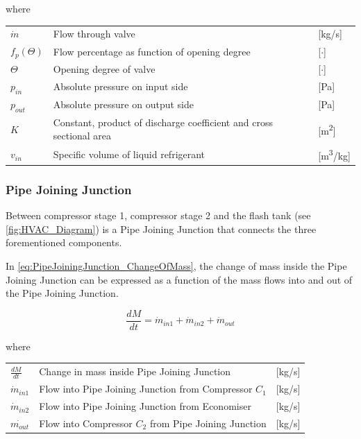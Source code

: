 where 
\begin{center}
	\begin{tabular}{l p{8cm} l}
		$\dot{m}$	& Flow through valve & [\si{kg}/\si{s}]\\ 
		$f_p(\Theta)$ & Flow percentage as function of opening degree & [$\cdot$] \\
		$ \Theta $ & Opening degree of valve& [$ \cdot $]\\
		$p_{in}$ 	& Absolute pressure on input side & [\si{Pa}]\\
		$p_{out}$ 	& Absolute pressure on output side & [\si{Pa}]\\
		$K$ 		& Constant, product of discharge coefficient and cross sectional area & [\si{m^2}]\\
		$v_{in}$ 	& Specific volume of liquid refrigerant & [\si{m^3}/\si{kg}]

	\end{tabular}
\end{center}

\subsubsection{Pipe Joining Junction} 
Between compressor stage 1, compressor stage 2 and the flash tank (see \cref{fig:HVAC_Diagram}) is a Pipe Joining Junction that connects the three forementioned components.

In \cref{eq:PipeJoiningJunction_ChangeOfMass}, the change of mass inside the Pipe Joining Junction can be expressed as a function of the mass flows into and out of the Pipe Joining Junction. 

\begin{equation} \label{eq:PipeJoiningJunction_ChangeOfMass}
	\frac{dM}{dt} = \dot{m}_{in1} + \dot{m}_{in2} + \dot{m}_{out}
\end{equation}


where 

\begin{center}
	\begin{tabular}{l p{8cm} l}
		$\frac{dM}{dt}$ & Change in mass inside Pipe Joining Junction		 	& [\si{kg}/\si{s}]\\ 
		$\dot{m}_{in1}$ & Flow into Pipe Joining Junction from Compressor $ C_1 $ 		& [\si{kg}/\si{s}]\\
		$\dot{m}_{in2}$ & Flow into Pipe Joining Junction from Economiser 				& [\si{kg}/\si{s}]\\
		$\dot{m_{out}}$ & Flow into Compressor $ C_2 $ from Pipe Joining Junction		& [\si{kg}/\si{s}]\\
	\end{tabular}
\end{center}

